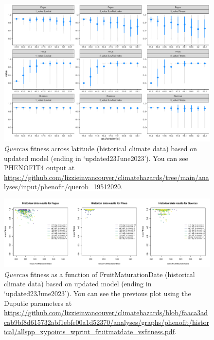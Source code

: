 \documentclass[11pt,letter]{article}
\begin{document}
\begin{figure}[h!]
 \begin{center}
\noindent \includegraphics[width=1\textwidth]{..//analyses/graphs/phenofit/historical/fitnessBuildup.pdf}
  \caption{\emph{Quercus} fitness across latitude (historical climate data) based on updated model (ending in `updated23June2023'). You can see PHENOFIT4 output at \url{https://github.com/lizzieinvancouver/climatehazards/tree/main/analyses/input/phenofit/querob_19512020}.}
  \label{fig:histdnew}
  \end{center}
\end{figure}


\begin{figure}[h!]
 \begin{center}
\noindent \includegraphics[width=1\textwidth]{..//analyses/graphs/phenofit/historical/allspp_xypoints_wprint_fruitmatdate_vsfitness.pdf}
  \caption{\emph{Quercus} fitness as a function of FruitMaturationDate (historical climate data) based on updated model (ending in `updated23June2023'). You can see the previous plot using the Duputie parameters at \url{https://github.com/lizzieinvancouver/climatehazards/blob/faaca3adcab9bf8d615732abf1ebfe00a1d52370/analyses/graphs/phenofit/historical/allspp_xypoints_wprint_fruitmatdate_vsfitness.pdf}.}
  \label{fig:fruitmatdate}
  \end{center}
\end{figure}
\end{document}
